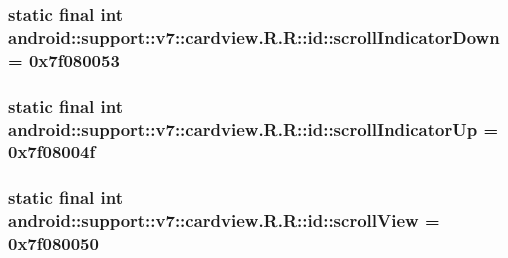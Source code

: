 \hypertarget{classandroid_1_1support_1_1v7_1_1cardview_1_1_r_1_1id_944ed6c47b16f83bb11b2d7c1485772f}{
\subsubsection[{scrollIndicatorDown}]{\setlength{\rightskip}{0pt plus 5cm}static final int android::support::v7::cardview.R.R::id::scrollIndicatorDown = 0x7f080053}}
\label{classandroid_1_1support_1_1v7_1_1cardview_1_1_r_1_1id_944ed6c47b16f83bb11b2d7c1485772f}


\hypertarget{classandroid_1_1support_1_1v7_1_1cardview_1_1_r_1_1id_009520b9c9d7512c36569347748d4a40}{
\subsubsection[{scrollIndicatorUp}]{\setlength{\rightskip}{0pt plus 5cm}static final int android::support::v7::cardview.R.R::id::scrollIndicatorUp = 0x7f08004f}}
\label{classandroid_1_1support_1_1v7_1_1cardview_1_1_r_1_1id_009520b9c9d7512c36569347748d4a40}


\hypertarget{classandroid_1_1support_1_1v7_1_1cardview_1_1_r_1_1id_954aa963ec5575239d604002dee1c330}{
\subsubsection[{scrollView}]{\setlength{\rightskip}{0pt plus 5cm}static final int android::support::v7::cardview.R.R::id::scrollView = 0x7f080050}}
\label{classandroid_1_1support_1_1v7_1_1cardview_1_1_r_1_1id_954aa963ec5575239d604002dee1c330}


